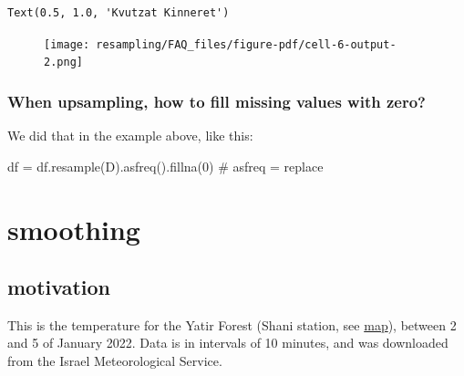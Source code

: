 \documentclass[
  letterpaper,
  DIV=11,
  numbers=noendperiod,
  oneside]{scrreprt}
\newenvironment{Shaded}{\begin{snugshade}}{\end{snugshade}}
\newcommand{\CommentTok}[1]{\textcolor[rgb]{0.37,0.37,0.37}{#1}}
\newcommand{\DecValTok}[1]{\textcolor[rgb]{0.68,0.00,0.00}{#1}}
\newcommand{\NormalTok}[1]{\textcolor[rgb]{0.00,0.23,0.31}{#1}}
\newcommand{\OperatorTok}[1]{\textcolor[rgb]{0.37,0.37,0.37}{#1}}
\newcommand{\StringTok}[1]{\textcolor[rgb]{0.13,0.47,0.30}{#1}}
\begin{document}
\begin{verbatim}
Text(0.5, 1.0, 'Kvutzat Kinneret')
\end{verbatim}

\begin{figure}[H]

{\centering \texttt{[image: resampling/FAQ\_files/figure-pdf/cell-6-output-2.png]}

}

\end{figure}

\hypertarget{when-upsampling-how-to-fill-missing-values-with-zero}{%
\section{When upsampling, how to fill missing values with
zero?}\label{when-upsampling-how-to-fill-missing-values-with-zero}}

We did that in the example above, like this:

\begin{Shaded}
\begin{Highlighting}[]
\NormalTok{df }\OperatorTok{=}\NormalTok{ df.resample(}\StringTok{\textquotesingle{}D\textquotesingle{}}\NormalTok{).asfreq().fillna(}\DecValTok{0}\NormalTok{)  }\CommentTok{\# asfreq = replace}
\end{Highlighting}
\end{Shaded}

\part{smoothing}

\hypertarget{motivation-1}{%
\chapter{motivation}\label{motivation-1}}

This is the temperature for the Yatir Forest (Shani station, see
\href{https://maps.app.goo.gl/JXfHcjE2Vn8YbS91A}{map}), between 2 and 5
of January 2022. Data is in intervals of 10 minutes, and was downloaded
from the Israel Meteorological Service.
\end{document}
